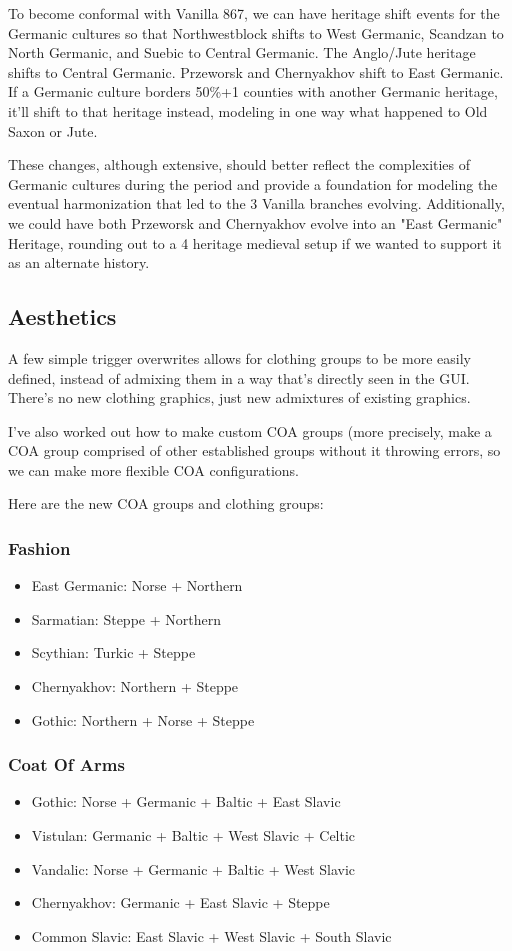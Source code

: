 \documentclass{article}
\begin{document}
	To become conformal with Vanilla 867, we can have heritage shift events for the Germanic cultures so that Northwestblock shifts to West Germanic, Scandzan to North Germanic, and Suebic to Central Germanic.
	The Anglo/Jute heritage shifts to Central Germanic.
	Przeworsk and Chernyakhov shift to East Germanic.
	If a Germanic culture borders 50\%+1 counties with another Germanic heritage, it'll shift to that heritage instead, modeling in one way what happened to Old Saxon or Jute.
	
	These changes, although extensive, should better reflect the complexities of Germanic cultures during the period and provide a foundation for modeling the eventual harmonization that led to the 3 Vanilla branches evolving.
	Additionally, we could have both Przeworsk and Chernyakhov evolve into an "East Germanic" Heritage, rounding out to a 4 heritage medieval setup if we wanted to support it as an alternate history. 
	
	\subsection{Aesthetics}
	\label{sec:culture_review:subsec:aesthetics}
	A few simple trigger overwrites allows for clothing groups to be more easily defined, instead of admixing them in a way that’s directly seen in the GUI. There’s no new clothing graphics, just new admixtures of existing graphics.
	
	I’ve also worked out how to make custom COA groups (more precisely, make a COA group comprised of other established groups without it throwing errors, so we can make more flexible COA configurations.
	
	Here are the new COA groups and clothing groups:
	
	\subsubsection{Fashion}
	\begin{itemize}
		\item East Germanic: Norse + Northern
		\item Sarmatian: Steppe + Northern
		\item Scythian: Turkic + Steppe
		\item Chernyakhov: Northern + Steppe
		\item Gothic: Northern + Norse + Steppe
	\end{itemize}
	
	\subsubsection{Coat Of Arms}
	\begin{itemize}
		\item Gothic: Norse + Germanic + Baltic + East Slavic
		\item Vistulan: Germanic + Baltic + West Slavic + Celtic
		\item Vandalic: Norse + Germanic + Baltic + West Slavic
		\item Chernyakhov: Germanic + East Slavic + Steppe
		\item Common Slavic: East Slavic + West Slavic + South Slavic
	\end{itemize}
	
\end{document}
